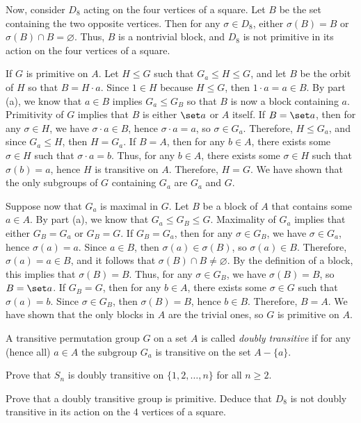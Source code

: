 \begin{solalph}
	Now, consider $D_8$ acting on the four vertices of a square. Let $B$ be the set containing the two opposite vertices. Then for any $\sigma \in D_8$, either $\sigma(B) = B$ or $\sigma(B) \cap B = \varnothing$. Thus, $B$ is a nontrivial block, and $D_8$ is not primitive in its action on the four vertices of a square.
	\item \rightimp If $G$ is primitive on $A$. Let $H \leq G$ such that $G_a \leq H \leq G$, and let $B$ be the orbit of $H$ so that $B = H \cdot a$. Since $1 \in H$ because $H \leq G$, then $1 \cdot a = a \in B$. By part (a), we know that $a \in B$ implies $G_a \leq G_B$ so that $B$ is now a block containing $a$. Primitivity of $G$ implies that $B$ is either $\set a$ or $A$ itself. If $B = \set a$, then for any $\sigma \in H$, we have $\sigma \cdot a \in B$, hence $\sigma \cdot a = a$, so $\sigma \in G_a$. Therefore, $H \leq G_a$, and since $G_a \leq H$, then $H = G_a$. If $B = A$, then for any $b \in A$, there exists some $\sigma \in H$ such that $\sigma \cdot a = b$. Thus, for any $b \in A$, there exists some $\sigma \in H$ such that $\sigma(b) = a$, hence $H$ is transitive on $A$. Therefore, $H = G$. We have shown that the only subgroups of $G$ containing $G_a$ are $G_a$ and $G$.
	
	\noindent\leftimp Suppose now that $G_a$ is maximal in $G$. Let $B$ be a block of $A$ that contains some $a \in A$. By part (a), we know that $G_a \leq G_B \leq G$. Maximality of $G_a$ implies that either $G_B = G_a$ or $G_B = G$. If $G_B = G_a$, then for any $\sigma \in G_B$, we have $\sigma \in G_a$, hence $\sigma(a) = a$. Since $a \in B$, then $\sigma(a) \in \sigma(B)$, so $\sigma(a) \in B$. Therefore, $\sigma(a) = a \in B$, and it follows that $\sigma(B) \cap B \neq \varnothing$. By the definition of a block, this implies that $\sigma(B) = B$. Thus, for any $\sigma \in G_B$, we have $\sigma(B) = B$, so $B = \set a$. If $G_B = G$, then for any $b \in A$, there exists some $\sigma \in G$ such that $\sigma(a) = b$. Since $\sigma \in G_B$, then $\sigma(B) = B$, hence $b \in B$. Therefore, $B = A$. We have shown that the only blocks in $A$ are the trivial ones, so $G$ is primitive on $A$.
\end{solalph}

\begin{exercise}
	A transitive permutation group $G$ on a set $A$ is called \emph{doubly transitive} if for any (hence all) $a \in A$ the subgroup $G_a$ is transitive on the set $A - \{a\}$.
	\begin{subproblems}
		\item Prove that $S_n$ is doubly transitive on $\{1,2,\ldots,n\}$ for all $n \ge 2$.
		\item Prove that a doubly transitive group is primitive. Deduce that $D_8$ is not doubly transitive in its action on the 4 vertices of a square.
	\end{subproblems}
\end{exercise}

